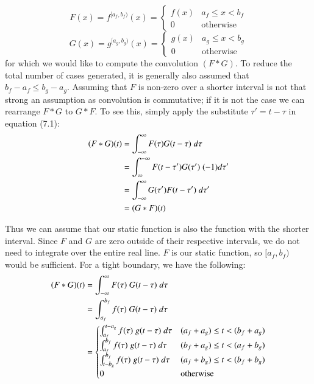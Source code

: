 \begin{equation}
	\label{eqn:fOnePiece}
	F(x)=f^{[a_f,b_f)}(x) = 
		\begin{cases}
			f(x) & a_f \leq x < b_f \\
			0 & \text{otherwise}
		\end{cases}
\end{equation}
\begin{equation}
	\label{eqn:gOnePiece}
	G(x)=g^{[a_g,b_g)}(x) = 
		\begin{cases}
			g(x) & a_g \leq x < b_g \\
			0 & \text{otherwise}
		\end{cases}
\end{equation}
for which we would like to compute the convolution $(F*G)$.
To reduce the total number of cases generated, it is generally also assumed that $b_f - a_f \leq b_g - a_g$.
Assuming that $F$ is non-zero over a shorter interval is not that strong an assumption as convolution is commutative;
if it is not the case we can rearrange $F*G$ to $G*F$.
To see this, simply apply the substitute $\tau' = t-\tau$ in equation (7.1):
\begin{align}
	\label{eqn:ConvCommutative}
	(F*G)(t) 
		&= \int_{-\infty}^\infty F(\tau) G(t-\tau) \;d \tau 
		\notag\\&= \int_{\infty}^{-\infty} F(t-\tau')G(\tau')\; (-1) d\tau' 
		\notag\\&= \int_{-\infty}^\infty G(\tau') F(t-\tau') \; d\tau'
		\notag\\&= (G*F)(t)
\end{align}


Thus we can assume that our static function is also the function with the shorter interval.
Since $F$ and $G$ are zero outside of their respective intervals, we do not need to integrate over the entire real line. 
$F$ is our static function, so $[a_f, b_f)$ would be sufficient.
For a tight boundary, we have the following:
\begin{align}
	\label{eqn:ConvNaiveOnePiece}
	(F*G)(t) 
	&= \int_{-\infty}^\infty F(\tau)\; G(t-\tau) \; d\tau \notag \\
	&= \int_{a_f}^{b_f} f(\tau) \; G(t-\tau) \; d\tau \notag \\
	&= 	\begin{cases}
			\int_{a_f}^{t-a_g} f(\tau) \; g(t-\tau) \; d\tau 	& (a_f+a_g) \leq t < (b_f+a_g) \\
			\int_{a_f}^{b_f} f(\tau) \; g(t-\tau) \; d\tau		& (b_f+a_g) \leq t < (a_f+b_g) \\
			\int_{t-b_g}^{b_f} f(\tau) \; g(t-\tau) \; d\tau	& (a_f+b_g) \leq t < (b_f+b_g) \\
			0										& \text{otherwise}
		\end{cases}
\end{align}


